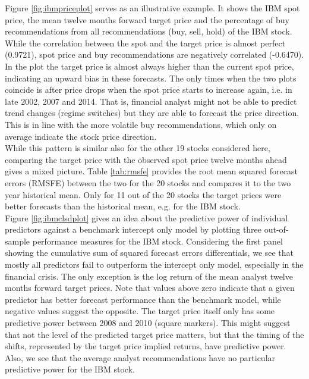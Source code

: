 \indent Figure \ref{fig:ibmpriceplot} serves as an illustrative example. It shows the IBM spot price, the mean twelve months forward target price and the percentage of buy recommendations from all recommendations (buy, sell, hold) of the IBM stock. While the correlation between the spot and the target price is almost perfect (0.9721), spot price and buy recommendations are negatively correlated (-0.6470). In the plot the target price is almost always higher than the current spot price, indicating an upward bias in these forecasts. The only times when the two plots coincide is after price drops when the spot price starts to increase again, i.e. in late 2002, 2007 and 2014. That is, financial analyst might not be able to predict trend changes (regime switches) but they are able to forecast the price direction. This is in line with the more volatile buy recommendations, which only on average indicate the stock price direction.\\%
%
\indent While this pattern is similar also for the other 19 stocks considered here, comparing the target price with the observed spot price twelve months ahead gives a mixed picture. Table \ref{tab:rmsfe} provides the root mean squared forecast errors (RMSFE) between the two for the 20 stocks and compares it to the two year historical mean. Only for 11 out of the 20 stocks the target prices were better forecasts than the historical mean, e.g. for the IBM stock.\\
%
\indent Figure \ref{fig:ibmclsdplot} gives an idea about the predictive power of individual predictors against a benchmark intercept only model by plotting three out-of-sample performance measures for the IBM stock. Considering the first panel showing the cumulative sum of squared forecast errors differentials, we see that mostly all predictors fail to outperform the intercept only model, especially in the financial crisis. The only exception is the log return of the mean analyst twelve months forward target prices.  Note that values above zero indicate that a given predictor has better forecast performance than the benchmark model, while negative values suggest the opposite. The target price itself only has some predictive power between 2008 and 2010 (square markers). This might suggest that not the level of the predicted target price matters, but that the timing of the shifts, represented by the target price implied returns, have predictive power. Also, we see that the average analyst recommendations have no particular predictive power for the IBM stock.\\  
